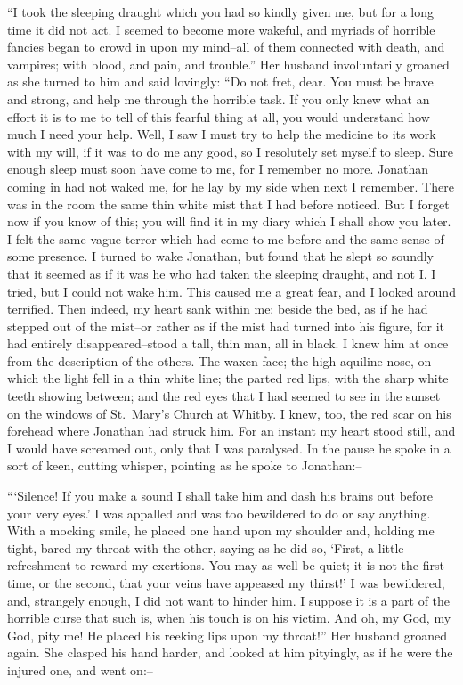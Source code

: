 \documentclass[12pt,openright]{book}
\begin{document}
“I took the sleeping draught which you had so kindly given me, but for a long time it did not act. I seemed to become more wakeful, and myriads of horrible fancies began to crowd in upon my mind–all of them connected with death, and vampires; with blood, and pain, and trouble.” Her husband involuntarily groaned as she turned to him and said lovingly: “Do not fret, dear. You must be brave and strong, and help me through the horrible task. If you only knew what an effort it is to me to tell of this fearful thing at all, you would understand how much I need your help. Well, I saw I must try to help the medicine to its work with my will, if it was to do me any good, so I resolutely set myself to sleep. Sure enough sleep must soon have come to me, for I remember no more. Jonathan coming in had not waked me, for he lay by my side when next I remember. There was in the room the same thin white mist that I had before noticed. But I forget now if you know of this; you will find it in my diary which I shall show you later. I felt the same vague terror which had come to me before and the same sense of some presence. I turned to wake Jonathan, but found that he slept so soundly that it seemed as if it was he who had taken the sleeping draught, and not I. I tried, but I could not wake him. This caused me a great fear, and I looked around terrified. Then indeed, my heart sank within me: beside the bed, as if he had stepped out of the mist–or rather as if the mist had turned into his figure, for it had entirely disappeared–stood a tall, thin man, all in black. I knew him at once from the description of the others. The waxen face; the high aquiline nose, on which the light fell in a thin white line; the parted red lips, with the sharp white teeth showing between; and the red eyes that I had seemed to see in the sunset on the windows of St. Mary’s Church at Whitby. I knew, too, the red scar on his forehead where Jonathan had struck him. For an instant my heart stood still, and I would have screamed out, only that I was paralysed. In the pause he spoke in a sort of keen, cutting whisper, pointing as he spoke to Jonathan:–

“‘Silence! If you make a sound I shall take him and dash his brains out before your very eyes.’ I was appalled and was too bewildered to do or say anything. With a mocking smile, he placed one hand upon my shoulder and, holding me tight, bared my throat with the other, saying as he did so, ‘First, a little refreshment to reward my exertions. You may as well be quiet; it is not the first time, or the second, that your veins have appeased my thirst!’ I was bewildered, and, strangely enough, I did not want to hinder him. I suppose it is a part of the horrible curse that such is, when his touch is on his victim. And oh, my God, my God, pity me! He placed his reeking lips upon my throat!” Her husband groaned again. She clasped his hand harder, and looked at him pityingly, as if he were the injured one, and went on:–
\end{document}
